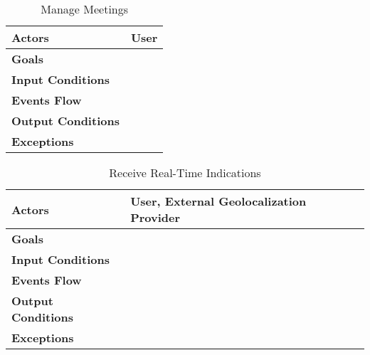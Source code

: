 \begin{table}[H]
	\centering
	\def\arraystretch{1.5}
	\begin{tabular}{|p{7cm}|p{7cm}|}
		\hline
		\textbf{Actors}            & User		    \\ \hline
		\textbf{Goals}             &            \\ \hline
		\textbf{Input Conditions}  &            \\ \hline
		\textbf{Events Flow}       &            \\ \hline
		\textbf{Output Conditions} &            \\ \hline
		\textbf{Exceptions}        &            \\ \hline
	\end{tabular}
	\caption{Manage Meetings}
\end{table}

\begin{table}[H]
	\centering
	\def\arraystretch{1.5}
	\begin{tabular}{|p{7cm}|p{7cm}|}
		\hline
		\textbf{Actors}            & User, External Geolocalization Provider		    \\ \hline
		\textbf{Goals}             &            \\ \hline
		\textbf{Input Conditions}  &            \\ \hline
		\textbf{Events Flow}       & 	        \\ \hline
		\textbf{Output Conditions} &            \\ \hline
		\textbf{Exceptions}        &            \\ \hline
	\end{tabular}
	\caption{Receive Real-Time Indications}
\end{table}


